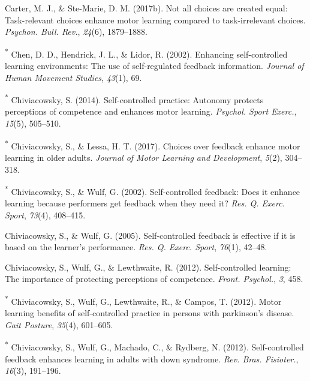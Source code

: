 \documentclass[
  english,
  man, donotrepeattitle,floatsintext]{apa7}
\newlength{\cslhangindent}
\newlength{\cslentryspacingunit} %
\newenvironment{CSLReferences}[2] %
 {%
  \setlength{\parindent}{0pt}
  \ifodd #1
  \let\oldpar\par
  \def\par{\hangindent=\cslhangindent\oldpar}
  \fi
  \setlength{\parskip}{#2\cslentryspacingunit}
 }%
 {}
\begin{document}
\begin{CSLReferences}{1}{0}
\leavevmode{}%
Carter, M. J., \& Ste-Marie, D. M. (2017b). Not all choices are created equal: Task-relevant choices enhance motor learning compared to task-irrelevant choices. \emph{Psychon. Bull. Rev.}, \emph{24}(6), 1879--1888.

\leavevmode{}%
\textsuperscript{*} Chen, D. D., Hendrick, J. L., \& Lidor, R. (2002). Enhancing self-controlled learning environments: The use of self-regulated feedback information. \emph{Journal of Human Movement Studies}, \emph{43}(1), 69.

\leavevmode{}%
\textsuperscript{*} Chiviacowsky, S. (2014). Self-controlled practice: Autonomy protects perceptions of competence and enhances motor learning. \emph{Psychol. Sport Exerc.}, \emph{15}(5), 505--510.

\leavevmode{}%
\textsuperscript{*} Chiviacowsky, S., \& Lessa, H. T. (2017). Choices over feedback enhance motor learning in older adults. \emph{Journal of Motor Learning and Development}, \emph{5}(2), 304--318.

\leavevmode{}%
\textsuperscript{*} Chiviacowsky, S., \& Wulf, G. (2002). Self-controlled feedback: Does it enhance learning because performers get feedback when they need it? \emph{Res. Q. Exerc. Sport}, \emph{73}(4), 408--415.

\leavevmode{}%
Chiviacowsky, S., \& Wulf, G. (2005). Self-controlled feedback is effective if it is based on the learner's performance. \emph{Res. Q. Exerc. Sport}, \emph{76}(1), 42--48.

\leavevmode{}%
Chiviacowsky, S., Wulf, G., \& Lewthwaite, R. (2012). Self-controlled learning: The importance of protecting perceptions of competence. \emph{Front. Psychol.}, \emph{3}, 458.

\leavevmode{}%
\textsuperscript{*} Chiviacowsky, S., Wulf, G., Lewthwaite, R., \& Campos, T. (2012). Motor learning benefits of self-controlled practice in persons with parkinson's disease. \emph{Gait Posture}, \emph{35}(4), 601--605.

\leavevmode{}%
\textsuperscript{*} Chiviacowsky, S., Wulf, G., Machado, C., \& Rydberg, N. (2012). Self-controlled feedback enhances learning in adults with down syndrome. \emph{Rev. Bras. Fisioter.}, \emph{16}(3), 191--196.


\end{CSLReferences}
\end{document}
